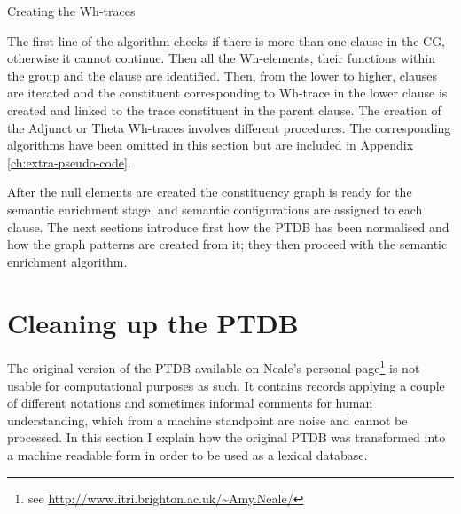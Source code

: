     \begin{algorithm}[!ht]
    	\Input { \cg}
    	\caption{Creating the Wh-traces}
    	\label{alg:create-wh-trace}
    \end{algorithm}

    The first line of the algorithm checks if there is more than one clause in the CG, otherwise it cannot continue. Then all the Wh-elements, their functions within the group and the clause are identified. Then, from the lower to higher, clauses are iterated and the constituent corresponding to Wh-trace in the lower clause is created and linked to the trace constituent in the parent clause. The creation of the Adjunct or Theta Wh-traces involves different procedures. The corresponding algorithms have been omitted in this section but are included in Appendix \ref{ch:extra-pseudo-code}. 

    After the null elements are created the constituency graph is ready for the semantic enrichment stage, and semantic configurations are assigned to each clause. The next sections introduce first how the PTDB has been normalised and how the graph patterns are created from it; they then proceed with the semantic enrichment algorithm.

\section{Cleaning up the PTDB}
\label{sec:claning-ptdb}

    The original version of the PTDB available on Neale's personal page\footnote{see \url{http://www.itri.brighton.ac.uk/~Amy.Neale/}} is not usable for computational purposes as such. It  contains records applying a couple of different notations and sometimes informal comments for human understanding, which from a machine standpoint are noise and cannot be processed. In this section I explain how the original PTDB was transformed into a machine readable form in order to be used as a lexical database.

